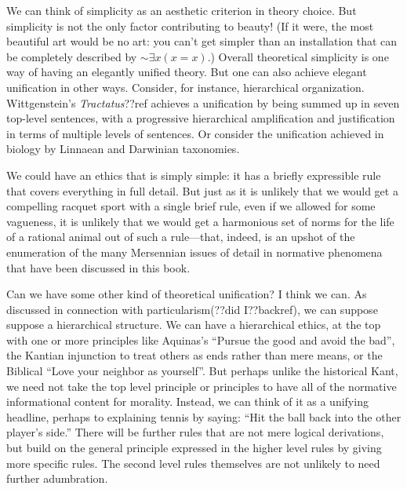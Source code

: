 We can think of simplicity as an aesthetic criterion in theory choice. But simplicity is not the only factor contributing
to beauty! (If it were, the most beautiful art would be no art: you can't get simpler than an installation that can be 
completely described by $\sim\exists x(x=x)$.) Overall theoretical simplicity is one way of having an elegantly unified
theory. But one can also achieve elegant unification in other ways. Consider, for instance, hierarchical organization. Wittgenstein's
\textit{Tractatus}??ref achieves a unification by being summed up in seven top-level sentences, with a progressive hierarchical
amplification and justification in terms of multiple levels of sentences. Or consider the unification achieved in biology by
Linnaean and Darwinian taxonomies.

We could have an ethics that is simply simple: it has a briefly expressible rule that covers everything in full detail. But 
just as it is unlikely that we would get a compelling racquet sport with a single brief rule, even if we allowed for some
vagueness, it is unlikely that we would get a harmonious set of norms for the life of a rational animal out of such a rule---that, 
indeed, is an upshot of the enumeration of the many Mersennian issues of detail in normative phenomena that have been discussed
in this book. 

Can we have some other kind of theoretical unification? I think we can. As discussed in connection with particularism(??did I??backref),
we can suppose suppose a hierarchical structure. We can have a hierarchical ethics, at the top with one or more principles like Aquinas's ``Pursue the good
and avoid the bad'', the Kantian injunction to treat others as ends rather than mere means, or the Biblical ``Love your neighbor as yourself''.
But perhaps unlike the historical Kant, we need not take the top level principle or principles to have all of the normative informational 
content for morality. Instead, we can think of it as a unifying headline, perhaps to explaining tennis by saying: ``Hit the ball back into the
other player's side.'' There will be further rules that are not mere logical derivations, but build on the general principle expressed in 
the higher level rules by giving more specific rules. The second level rules themselves are not unlikely to need further adumbration.

